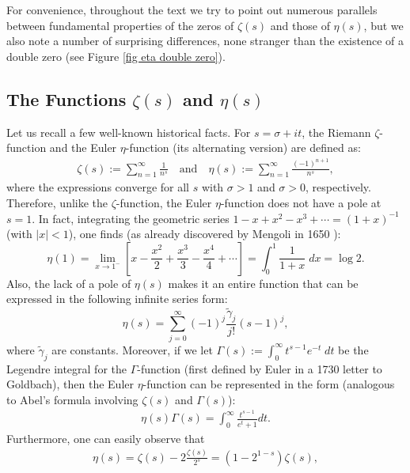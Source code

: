 \documentclass{amsart}
\theoremstyle{plain}
\theoremstyle{definition}
\newcommand{\gameta}[1]{\widetilde\gamma_{#1}}
\begin{document}
For convenience, throughout the text we try to point out numerous parallels between fundamental properties of the zeros of $\zeta(s)$ and those of $\eta(s)$, but we also note a number of surprising differences, none stranger than the existence of a double zero (see Figure \ref{fig eta double zero}). 




\subsection*{The Functions $\zeta(s)$ and $\eta(s)$}
Let us recall a few well-known historical facts. For $s=\sigma + it$,  the Riemann $\zeta$-function and the Euler $\eta$-function (its alternating version) are defined as: 
\begin{align}\label{eq eta}
  \zeta(s) := \sum_{n=1}^{\infty}\frac{1}{n^s} \quad \mathrm{and} \quad  \eta(s) := \sum_{n=1}^{\infty}\frac{(-1)^{n+1}}{n^s},
\end{align}
    where the expressions converge for all $s$ with $\sigma >1$ and $\sigma >0$, respectively. Therefore, unlike the $\zeta$-function, the Euler $\eta$-function does not have a pole at $s=1$. In fact, integrating the geometric series $1 - x + x^2 - x^3 +  \cdots = (1+x)^{-1}$ (with $|x| < 1$), one finds (as already discovered by Mengoli in 1650 \cite{mengoli}):  
\[
\eta(1) = \lim_{x \to 1^-} \left[ x - \frac{x^2}{2} + \frac{x^3}{3} - \frac{x^4}{4} + \cdots \right]  =  \int_0^1 \frac{1}{1+x}  \; dx = \log 2.
\]
Also, the lack of a pole of \(\eta(s)\) makes it an entire function that can be expressed in the following infinite series form:
\begin{equation}\label{eq eta laurent}
\eta(s)=\sum_{j=0}^\infty (-1)^j\frac{\gameta{j}}{j!}(s-1)^j,
\end{equation}
where $\gameta{j}$ are constants. Moreover, if we let $\Gamma(s) := \int_0^{\infty} t^{s-1} e^{-t} \; dt$ be the Legendre \cite{le-1809} integral for the $\Gamma$-function (first defined by Euler \cite{euler1730} in a 1730 letter to Goldbach), then the Euler $\eta$-function can be represented in the form (analogous to Abel's formula \cite{abel1823} involving $\zeta(s)$ and $\Gamma(s)$):
\begin{align*} 
    \eta(s)\Gamma(s) = \int_0^\infty\frac{t^{s-1}}{e^t+1}dt.
\end{align*}
Furthermore, one can easily observe that
\begin{align}\label{altern zeta}
    \eta(s) = \zeta(s) - 2 \frac{\zeta(s)}{2^s} = \left(1-2^{1-s}\right)\zeta(s),
\end{align}
\end{document}
